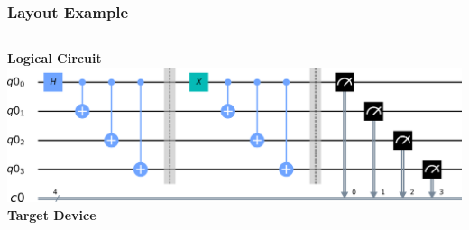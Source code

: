\documentclass[aspectratio=169,11pt,hyperref={colorlinks=true}]{beamer}
\begin{document}
\begin{frame}
    \frametitle{Layout Example}
    \begin{columns}
            \centering
            \textbf{Logical Circuit}
            \includegraphics[width=\textwidth]{no_layout.png}
            \centering
            \textbf{Target Device}
    \end{columns}
\end{frame}
\end{document}
